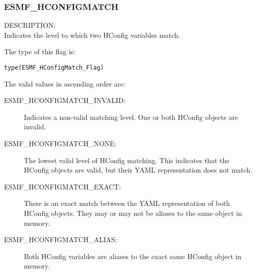 

\subsubsection{ESMF\_HCONFIGMATCH}
\label{const:hconfigmatch}

{\sf DESCRIPTION:\\}
Indicates the level to which two HConfig variables match.

The type of this flag is:

{\tt type(ESMF\_HConfigMatch\_Flag)}

The valid values in ascending order are:
\begin{description}
\item [ESMF\_HCONFIGMATCH\_INVALID:] Indicates a non-valid matching level. One
  or both HConfig objects are invalid.
\item [ESMF\_HCONFIGMATCH\_NONE:] The lowest valid level of HConfig matching.
  This indicates that the HConfig objects are valid, but their YAML
  representation does not match.
\item [ESMF\_HCONFIGMATCH\_EXACT:] There is an exact match between the YAML
  representation of both HConfig objects. They may or may not be aliases to
  the same object in memory.
\item [ESMF\_HCONFIGMATCH\_ALIAS:] Both HConfig variables are aliases to the
  exact same HConfig object in memory.
\end{description}
